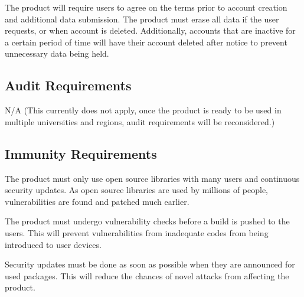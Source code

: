 \documentclass{article}
\begin{document}
The product will require users to agree on the terms prior to account creation and additional data submission.
The product must erase all data if the user requests, or when account is deleted.
Additionally, accounts that are inactive for a certain period of time will have their account deleted after notice to prevent unnecessary data being held.

\subsection{Audit Requirements}

N/A (This currently does not apply, once the product is ready to be used in multiple universities and regions, audit requirements will be reconsidered.)

\subsection{Immunity Requirements}

The product must only use open source libraries with many users and continuous security updates. 
As open source libraries are used by millions of people, vulnerabilities are found and patched much earlier.

The product must undergo vulnerability checks before a build is pushed to the users.
This will prevent vulnerabilities from inadequate codes from being introduced to user devices.

Security updates must be done as soon as possible when they are announced for used packages.
This will reduce the chances of novel attacks from affecting the product.
\end{document}
